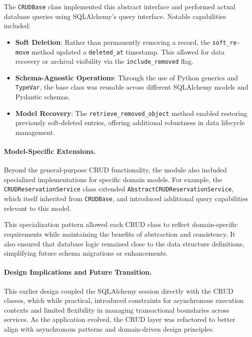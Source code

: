 The \texttt{CRUDBase} class implemented this abstract interface and performed actual database queries using SQLAlchemy's query interface. Notable capabilities included:

\begin{itemize}
  \item \textbf{Soft Deletion}: Rather than permanently removing a record, the \texttt{soft\_re-} \texttt{move} method updated a \texttt{deleted\_at} timestamp. This allowed for data recovery or archival visibility via the \texttt{include\_removed} flag.
  \item \textbf{Schema-Agnostic Operations}: Through the use of Python generics and \texttt{TypeVar}, the base class was reusable across different SQLAlchemy models and Pydantic schemas.
  \item \textbf{Model Recovery}: The \texttt{retrieve\_removed\_object} method enabled restoring previously soft-deleted entries, offering additional robustness in data lifecycle management.
\end{itemize}

\paragraph{Model-Specific Extensions.}%
Beyond the general-purpose CRUD functionality, the module also included specialized implementations for specific domain models. For example, the \texttt{CRUDReservationService} class extended \texttt{AbstractCRUDReservationService}, which itself inherited from \texttt{CRUDBase}, and introduced additional query capabilities relevant to this model.

This specialization pattern allowed each CRUD class to reflect domain-specific requirements while maintaining the benefits of abstraction and consistency. It also ensured that database logic remained close to the data structure definitions, simplifying future schema migrations or enhancements.

\paragraph{Design Implications and Future Transition.}%
This earlier design coupled the SQLAlchemy session directly with the CRUD classes, which while practical, introduced constraints for asynchronous execution contexts and limited flexibility in managing transactional boundaries across services. As the application evolved, the CRUD layer was refactored to better align with asynchronous patterns and domain-driven design principles.

